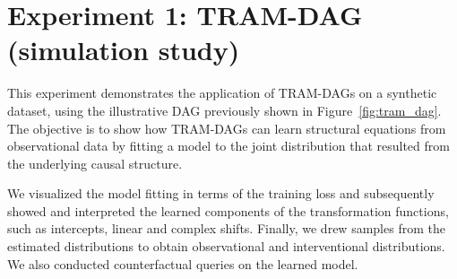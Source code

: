% 
% 

% 
% 


% 






\section{Experiment 1: TRAM-DAG (simulation study)} \label{sec:methods_experiment1}

This experiment demonstrates the application of TRAM-DAGs on a synthetic dataset, using the illustrative DAG previously shown in Figure~\ref{fig:tram_dag}. The objective is to show how TRAM-DAGs can learn structural equations from observational data by fitting a model to the joint distribution that resulted from the underlying causal structure.

We visualized the model fitting in terms of the training loss and subsequently showed and interpreted the learned components of the transformation functions, such as intercepts, linear and complex shifts. Finally, we drew samples from the estimated distributions to obtain observational and interventional distributions. We also conducted counterfactual queries on the learned model.

